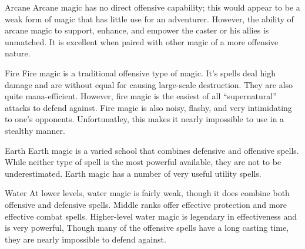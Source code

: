 \documentclass[twoside]{book}
\begin{document}
              
                  Arcane   Arcane magic has no
                  direct offensive capability; this would appear to be a
                  weak form of magic that has little use for an
                  adventurer. However, the ability of arcane magic to
                  support, enhance, and empower the caster or his allies
                  is unmatched. It is excellent when paired with other
                  magic of a more offensive nature.
                
              
                  Fire   Fire magic is a
                  traditional offensive type of magic. It’s spells
                  deal high damage and are without equal for causing
                  large-scale destruction. They are also quite
                  mana-efficient. However, fire magic is the easiest of
                  all “supernatural” attacks to defend
                  against. Fire magic is also noisy, flashy, and very
                  intimidating to one’s opponents. Unfortunatley,
                  this makes it nearly impossible to use in a stealthy
                  manner.
                
              
                  Earth   Earth magic is a
                  varied school that combines defensive and offensive
                  spells. While neither type of spell is the most
                  powerful available, they are not to be underestimated.
                  Earth magic has a number of very useful utility spells.
                
              
                  Water   At lower levels,
                  water magic is fairly weak, though it does combine both
                  offensive and defensive spells. Middle ranks offer
                  effective protection and more effective combat spells.
                  Higher-level water magic is legendary in effectiveness
                  and is very powerful, Though many of the offensive
                  spells have a long casting time, they are nearly
                  impossible to defend against.
                
            
\end{document}
